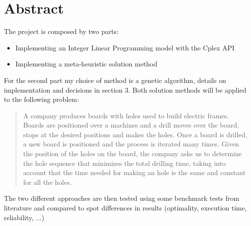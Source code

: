 \section{Abstract}
	The project is composed by two parts:
	\begin{itemize}
		\item Implementing an Integer Linear Programming model with the Cplex API
		\item Implementing a meta-heuristic solution method
	\end{itemize}
	For the second part my choice of method is a genetic algorithm, details on implementation and decisions in section 3.
	Both solution methods will be applied to the following problem:
	\blockquote{A company produces boards with holes used to build electric frames.  Boards are positioned over a machines and a drill moves over the board, stops at the desired positions and makes the holes.  Once a board is drilled, a new board is positioned and the process is iterated many times.  Given the position of the holes on the board, the company asks us to determine the hole sequence that minimizes the total drilling time, taking into account that the time needed for making an hole is the same and constant for all the holes.}
	The two different approaches are then tested using some benchmark tests from literature and compared to spot differences in results (optimality, execution time, reliability, ...)
	